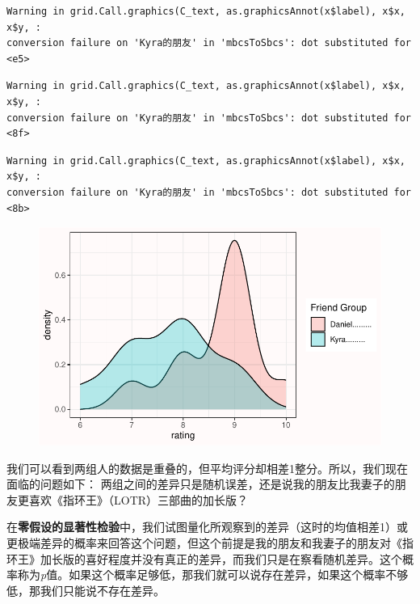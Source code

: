 \documentclass[
  letterpaper,
  DIV=11,
  numbers=noendperiod]{scrreprt}
\begin{document}
\begin{verbatim}
Warning in grid.Call.graphics(C_text, as.graphicsAnnot(x$label), x$x, x$y, :
conversion failure on 'Kyra的朋友' in 'mbcsToSbcs': dot substituted for <e5>
\end{verbatim}

\begin{verbatim}
Warning in grid.Call.graphics(C_text, as.graphicsAnnot(x$label), x$x, x$y, :
conversion failure on 'Kyra的朋友' in 'mbcsToSbcs': dot substituted for <8f>
\end{verbatim}

\begin{verbatim}
Warning in grid.Call.graphics(C_text, as.graphicsAnnot(x$label), x$x, x$y, :
conversion failure on 'Kyra的朋友' in 'mbcsToSbcs': dot substituted for <8b>
\end{verbatim}

\begin{figure}

{\centering \includegraphics[width=1\textwidth,height=\textheight]{01-pvalue_files/figure-pdf/unnamed-chunk-3-1.pdf}

}

\end{figure}

我们可以看到两组人的数据是重叠的，但平均评分却相差1整分。所以，我们现在面临的问题如下：
两组之间的差异只是随机误差，还是说我的朋友比我妻子的朋友更喜欢《指环王》（LOTR）三部曲的加长版？

在\textbf{零假设的显著性检验}中，我们试图量化所观察到的差异（这时的均值相差1）或更极端差异的概率来回答这个问题，但这个前提是我的朋友和我妻子的朋友对《指环王》加长版的喜好程度并没有真正的差异，而我们只是在察看随机差异。这个概率称为\emph{p}值。如果这个概率足够低，那我们就可以说存在差异，如果这个概率不够低，那我们只能说不存在差异。
\end{document}
